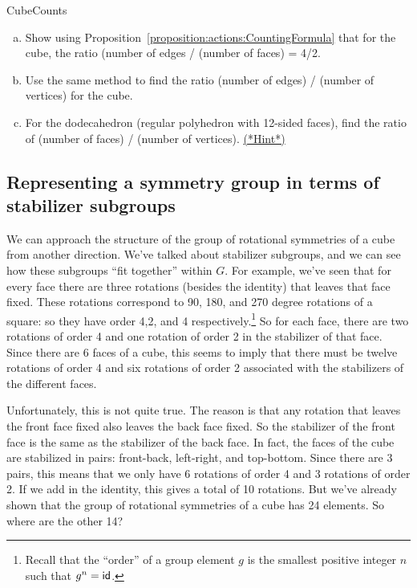 \begin{exercise}{CubeCounts}
\begin{enumerate}[(a)]
\item
Show using Proposition~\ref{proposition:actions:CountingFormula} that for the cube, the ratio (number of edges / (number of  faces) = 4/2. 
\item Use the same method to find the ratio (number of edges) / (number of vertices) for the cube.
\item For the dodecahedron (regular polyhedron with 12-sided faces), find the ratio of (number of faces) / (number of vertices).
\hyperref[sec:actions:hints]{(*Hint*)}
\end{enumerate}
\end{exercise} 

\subsection{Representing a symmetry group in terms of stabilizer subgroups}
We can approach the structure of the group of rotational symmetries of a cube from another direction.  We've talked about stabilizer subgroups, and we can see how these subgroups ``fit together'' within $G$.
For example, we've seen that for every face there are three rotations (besides the identity) that leaves that face fixed. These rotations correspond to 90, 180, and 270 degree rotations of a square: so they have order 4,2, and 4 respectively.\footnote{Recall that the ``order'' of a group element $g$ is the smallest positive integer $n$ such that $g^n = \sf{id}$.} So for each face, there are two rotations of order 4 and one rotation of order 2 in the stabilizer of that face. Since there are 6 faces of a cube, this seems to imply that there must be twelve rotations of order 4 and six rotations of order 2 associated with the stabilizers of the different faces.  

Unfortunately, this is not quite true. The reason is that any rotation that leaves the front face fixed also leaves the back face fixed. So the stabilizer of the front face is the same as the stabilizer  of the back face. In fact, the faces of the cube are stabilized in pairs: front-back, left-right, and top-bottom. Since there are 3 pairs, this means that we only have 6 rotations of order 4 and 3 rotations of order 2. If we add in the identity, this gives a total of 10 rotations. But we've already shown that the group of rotational symmetries of a cube has 24 elements. So where are the other 14?

